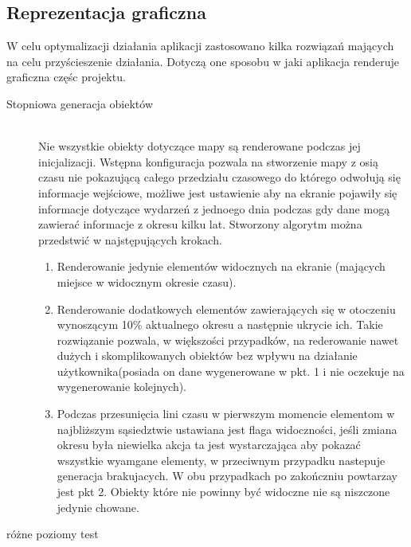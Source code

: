 \subsection{Reprezentacja graficzna}
\label{subsec:showing}

W celu optymalizacji działania aplikacji zastosowano kilka rozwiązań mających na celu przyścieszenie działania. Dotyczą one sposobu w jaki aplikacja renderuje graficzna częśc projektu.


\begin{description}
\item[Stopniowa generacja obiektów]\hfill \\
Nie wszystkie obiekty dotyczące mapy są renderowane podczas jej inicjalizacji. Wstępna konfiguracja pozwala na stworzenie mapy z osią czasu nie pokazującą całego przedziału czasowego do którego odwołują się informacje wejściowe, możliwe jest ustawienie aby na ekranie pojawiły się informacje dotyczące wydarzeń z jednoego dnia podczas gdy dane mogą zawierać informacje z okresu kilku lat. Stworzony algorytm można przedstwić w najstępujących krokach.

\begin{enumerate}
\item
Renderowanie jedynie elementów widocznych na ekranie (mających miejsce w widocznym okresie czasu).

\item
Renderowanie dodatkowych elementów zawierających się w otoczeniu wynoszącym 10\% aktualnego okresu a następnie ukrycie ich. Takie rozwiązanie pozwala, w większości przypadków, na rederowanie nawet dużych i skomplikowanych obiektów bez wpływu na działanie użytkownika(posiada on dane wygenerowane w pkt. 1 i nie oczekuje na wygenerowanie kolejnych).

\item
Podczas przesunięcia lini czasu w pierwszym momencie elementom w najbliższym sąsiedztwie ustawiana jest flaga widoczności, jeśli zmiana okresu była niewielka akcja ta jest wystarczająca aby pokazać wszystkie wyamgane elementy, w przeciwnym przypadku nastepuje generacja brakujacych. W obu przypadkach po zakończniu powtarzay jest pkt 2. Obiekty które nie powinny być widoczne nie są niszczone jedynie chowane.

\end{enumerate}

\item[różne poziomy test]\hfill \\

\end{description}
